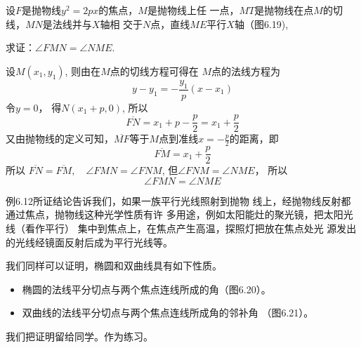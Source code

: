 \begin{example}
    设$F$是抛物线$y^2=2px$的焦点，$M$是抛物线上任
    一点，$MT$是抛物线在点$M$的切线，$MN$是法线并与$X$轴相
    交于$N$点，直线$ME$平行$X$轴（图6.19),
    
    求证：$\angle FMN=\angle NME$.
\end{example}

\begin{solution}
设$M(x_1,y_1)$, 则由在$M$点的切线方程可得在
$M$点的法线方程为
\[y-y_1=-\frac{y_1}{p}(x-x_1)\]
令$y=0$，
得$N(x_1+p,0)$, 
所以
\[\overline{FN}=x_1+p-\frac{p}{2}= x_1+\frac{p}{2}\]
又由抛物线的定义可知，$\overline{MF}$等于$M$点到准线$x=-\frac{p}{2}$的距离，即
\[\overline{FM}=x_1+\frac{p}{2}\]
所以
$\overline{FN}=\overline{FM},\quad \angle FMN=\angle FNM$, 
但$\angle FNM=\angle NME$，
所以
\[\angle FMN=\angle NME\]
\end{solution}

例6.12所证结论告诉我们，如果一族平行光线照射到抛物
线上，经抛物线反射都通过焦点，抛物线这种光学性质有许
多用途，例如太阳能灶的聚光镜，把太阳光线（看作平行）
集中到焦点上，在焦点产生高温，探照灯把放在焦点处光
源发出的光线经镜面反射后成为平行光线等。

我们同样可以证明，椭圆和双曲线具有如下性质。
\begin{itemize}
    \item 椭圆的法线平分切点与两个焦点连线所成的角（图6.20）。
    \item 双曲线的法线平分切点与两个焦点连线所成角的邻补角
（图6.21）。
\end{itemize}

我们把证明留给同学。作为练习。
    
